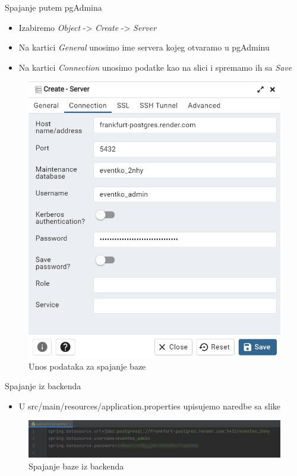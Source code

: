 \begin{packed_enum}
				\item Spajanje putem pgAdmina
				\begin{itemize}
					\item Izabiremo \textit{Object} -> \textit{Create} -> \textit{Server}
					\item Na kartici \textit{General} unosimo ime servera kojeg otvaramo u pgAdminu
					\item Na kartici \textit{Connection} unosimo podatke kao na slici i spremamo ih sa \textit{Save}
				\end{itemize}
				\begin{figure}[H]
					\includegraphics[width=\textwidth]{Opis deploymenta/Slika3.png}
					\caption{Unos podataka za spajanje baze}
				\end{figure}
			
				\item Spajanje iz backenda
				\begin{itemize}
					\item U src/main/resources/application.properties upisujemo naredbe sa slike
				\end{itemize}
				\begin{figure}[H]
					\includegraphics[width=\textwidth]{Opis deploymenta/Slika4.png}
					\caption{Spajanje baze iz backenda}
				\end{figure}
			\end{packed_enum}
			\eject
			
